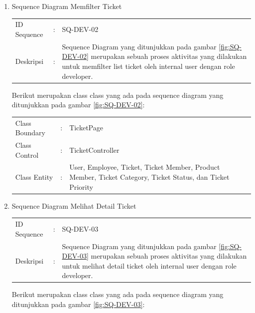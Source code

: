 \documentclass[12pt]{article}
\begin{document}
\begin{enumerate}[label=\textbf{4.\arabic*.}]
\begin{enumerate} [label=\textbf{4.2.\arabic*.}, wide, labelwidth=!, labelindent=0pt]
\begin{enumerate}[label=\textbf{4.2.2.\arabic*.}, wide, labelwidth=!, labelindent=0pt]
\begin{enumerate}[label=\arabic*.]
\begin{tabularx}{.9\linewidth}{@{} l l X @{}}
                \end{tabularx}
                
                \item Sequence Diagram Memfilter Ticket
                
                \begin{tabularx}{.9\linewidth}{@{} l l X @{}}
                    ID Sequence &	: & SQ-DEV-02 \\
                    Deskripsi &	: & Sequence Diagram yang ditunjukkan pada gambar \ref{fig:SQ-DEV-02} merupakan sebuah proses aktivitas yang dilakukan untuk memfilter list ticket oleh internal user dengan role developer. 
        
                \end{tabularx}

                \noindent Berikut merupakan class class yang ada pada sequence diagram yang ditunjukkan pada gambar \ref{fig:SQ-DEV-02}:

                \begin{tabularx}{.9\linewidth}{@{} l l X @{}}
                    Class Boundary & : & TicketPage \\
                    Class Control & : & TicketController \\
                    Class Entity & : &  User, Employee, Ticket, Ticket Member, Product Member, Ticket Category, Ticket Status, dan Ticket Priority
                
                \end{tabularx}
                
                \item Sequence Diagram Melihat Detail Ticket
                
                \begin{tabularx}{.9\linewidth}{@{} l l X @{}}
                    ID Sequence &	: & SQ-DEV-03 \\
                    Deskripsi &	: & Sequence Diagram yang ditunjukkan pada gambar \ref{fig:SQ-DEV-03} merupakan sebuah proses aktivitas yang dilakukan untuk melihat detail ticket oleh internal user dengan role developer. 
        
                \end{tabularx}

                \noindent Berikut merupakan class class yang ada pada sequence diagram yang ditunjukkan pada gambar \ref{fig:SQ-DEV-03}:


\end{enumerate}
\end{enumerate}
\end{enumerate}
\end{enumerate}
\end{document}
